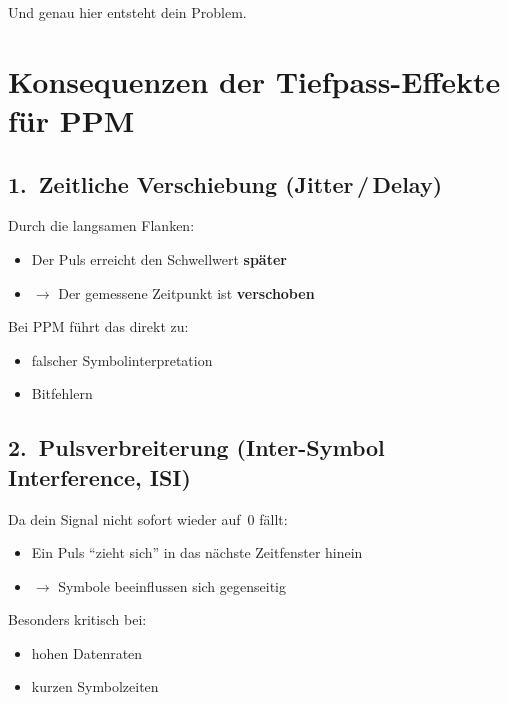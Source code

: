 \documentclass[a4paper,12pt]{article}
\begin{document}
Und genau hier entsteht dein Problem.

\section*{Konsequenzen der Tiefpass-Effekte für PPM}

\subsection*{1.\ Zeitliche Verschiebung (Jitter\,/\,Delay)}

Durch die langsamen Flanken:

\begin{itemize}
  \item Der Puls erreicht den Schwellwert \textbf{später}
  \item $\rightarrow$ Der gemessene Zeitpunkt ist \textbf{verschoben}
\end{itemize}

Bei PPM führt das direkt zu:

\begin{itemize}
  \item falscher Symbolinterpretation
  \item Bitfehlern
\end{itemize}

\subsection*{2.\ Pulsverbreiterung (Inter-Symbol Interference, ISI)}

Da dein Signal nicht sofort wieder auf~0 fällt:

\begin{itemize}
  \item Ein Puls \enquote{zieht sich} in das nächste Zeitfenster hinein
  \item $\rightarrow$ Symbole beeinflussen sich gegenseitig
\end{itemize}

Besonders kritisch bei:

\begin{itemize}
  \item hohen Datenraten
  \item kurzen Symbolzeiten
\end{itemize}

\end{document}
